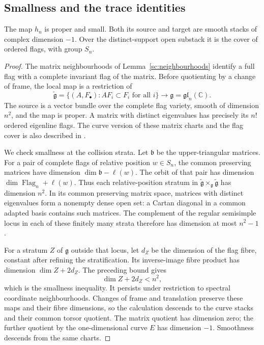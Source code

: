 \subsection{Smallness and the trace identities}

\begin{lemma}\label{sh:smallness}
The map $h_n$ is proper and small. Both its source and target are
smooth stacks of complex dimension $-1$. Over the distinct-support
open substack it is the cover of ordered flags, with group $S_n$.
\end{lemma}
\begin{proof}
The matrix neighbourhoods of Lemma~\ref{sc:neighbourhoods}
identify a full flag with a complete invariant flag of the matrix.
Before quotienting by a change of frame, the local map is a
restriction of
\[
 \widetilde{\mathfrak g}
 =\{(A,F_\bullet):AF_i\subset F_i\text{ for all }i\}
 \longrightarrow\mathfrak g=\mathfrak{gl}_n(\mathbb C).
\]
The source is a vector bundle over the complete flag variety,
smooth of dimension $n^2$, and the map is proper. A matrix with
distinct eigenvalues has precisely its $n!$ ordered eigenline
flags. The curve version of these matrix charts and the flag
cover is also described in \cite[\S\S3.1--3.3]{FengYunZhang2024}.

We check smallness at the collision strata. Let $\mathfrak b$
be the upper-triangular matrices. For a pair of complete flags of
relative position $w\in S_n$, the common preserving matrices
have dimension $\dim\mathfrak b-\ell(w)$. The orbit of that pair
has dimension $\dim\operatorname{Flag}_n+\ell(w)$. Thus each
relative-position stratum in
$\widetilde{\mathfrak g}\times_{\mathfrak g}
\widetilde{\mathfrak g}$ has dimension $n^2$.
In its common preserving matrix space, matrices with distinct
eigenvalues form a nonempty dense open set: a Cartan diagonal in
a common adapted basis contains such matrices. The complement
of the regular semisimple locus in each of these finitely many
strata therefore has dimension at most $n^2-1$.

For a stratum $Z$ of $\mathfrak g$ outside that locus, let $d_Z$
be the dimension of the flag fibre, constant after refining the
stratification. Its inverse-image fibre product has dimension
$\dim Z+2d_Z$. The preceding bound gives
\[
 \dim Z+2d_Z<n^2,
\]
which is the smallness inequality. It persists under restriction
to spectral coordinate neighbourhoods. Changes of frame and
translation preserve these maps and their fibre dimensions, so
the calculation descends to the curve stacks and their common
torsor quotient. The matrix quotient has dimension zero; the
further quotient by the one-dimensional curve $E$ has dimension
$-1$. Smoothness descends from the same charts.
\end{proof}

